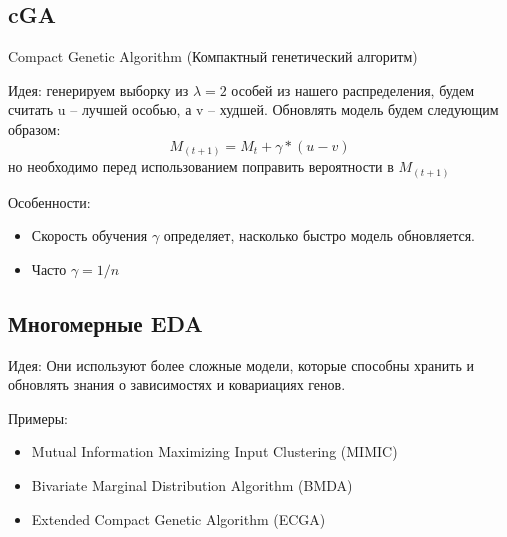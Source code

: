 \subsection*{cGA}
Compact Genetic Algorithm (Компактный генетический алгоритм)

Идея: генерируем выборку из $\lambda=2$ особей из нашего распределения, будем считать u – лучшей особью, а v – худшей. Обновлять модель будем следующим образом:  $$M_{(t+1)} = M_t +\gamma*(u-v) $$ но необходимо перед использованием поправить вероятности в $M_{(t+1)}$

Особенности: 

\begin{itemize}
      \item Скорость обучения  $\gamma$ определяет, насколько быстро модель обновляется.
      \item Часто  $\gamma = 1/n$ 
   \end{itemize}

\subsection*{Многомерные EDA}
Идея: Они используют более сложные модели, которые способны хранить и обновлять знания о зависимостях и ковариациях генов. 

Примеры:

\begin{itemize}
      \item Mutual Information Maximizing Input Clustering (MIMIC)
      \item Bivariate Marginal Distribution Algorithm (BMDA)
      \item Extended Compact Genetic Algorithm (ECGA)
   \end{itemize}

